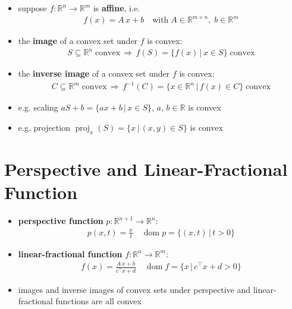 \documentclass[11pt]{extarticle}
\newcommand{\ds}{\displaystyle}
\newcommand{\ie}{\,\Longrightarrow\,}
\DeclareMathOperator*{\dom}{dom}
\DeclareMathOperator*{\proj}{proj}
\theoremstyle{definition}
\begin{document}
\begin{itemize}
  \item suppose $\ds f:\mathbb{R}^n\to\mathbb{R}^m$ is {\bf affine}, i.e. 
    \begin{align*}
      f(x) = A\,x + b\quad\text{with}\;A\in\mathbb{R}^{m\times n},\;b\in\mathbb{R}^m
    \end{align*}
  \item the {\bf image} of a convex set under $f$ is convex: 
    \begin{align*}
      S\subseteq\mathbb{R}^n\;\text{convex}\ie f(S) = \{f(x)\,|\,x\in S\}\;\text{convex}
    \end{align*}
  \item the {\bf inverse image} of a convex set under $f$ is convex: 
    \begin{align*}
      C\subseteq\mathbb{R}^m\;\text{convex}\ie f^{-1}(C) = \{x\in\mathbb{R}^n\,|\,f(x)\in C\}\;\text{convex}
    \end{align*}
  \item e.g. scaling $\ds a S + b = \{a x + b\,|\,x\in S\}$, $a$, $b\in\mathbb{R}$ is convex
  \item e.g. projection $\ds \proj_x(S) = \{x\,|\,(x, y)\in S\}$ is convex
\end{itemize}

\newpage

\section*{Perspective and Linear-Fractional Function}

\begin{itemize}
  \item {\bf perspective function} $\ds p:\mathbb{R}^{n + 1}\to\mathbb{R}^n$: 
    \begin{align*}
      p(x, t) = \frac{x}{t}\quad\dom p = \{(x, t)\,|\,t > 0\} 
    \end{align*}
  \item {\bf linear-fractional function} $\ds f:\mathbb{R}^n\to\mathbb{R}^m$: 
    \begin{align*}
      f(x) = \frac{A\,x + b}{c^\top x + d}\quad\dom f = \{x\,|\,c^\top x + d > 0\} 
    \end{align*}
  \item images and inverse images of convex sets under perspective and linear-fractional functions are all convex
\end{itemize}

\newpage
\end{document}
